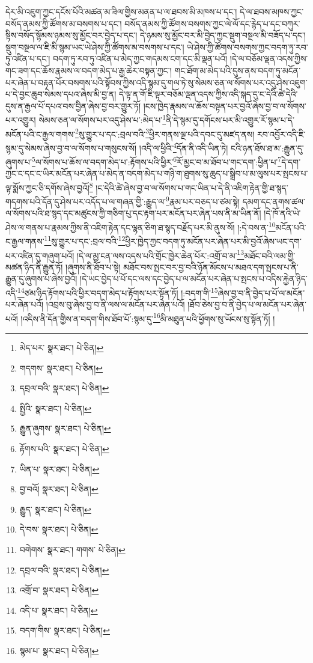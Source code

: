 དེར་མི་འཇུག་ཀྱང་དངོས་པོའི་མཚན་མ་ཟིལ་གྱིས་མནན་པ་ལ་ཐབས་མི་མཁས་པ་དང་། དེ་ལ་ཐབས་མཁས་ཀྱང་བསོད་ནམས་ཀྱི་ཚོགས་མ་བསགས་པ་དང་། བསོད་ནམས་ཀྱི་ཚོགས་བསགས་ཀྱང་ལེ་ལོ་དང་རྙེད་པ་དང་བཀུར་སྟིས་བསོད་སྙོམས་ཉམས་སུ་མྱོང་བར་བྱེད་པ་དང་། དེ་ཉམས་སུ་མྱོང་བར་མི་བྱེད་ཀྱང་སྡུག་བསྔལ་མི་བཟོད་པ་དང་། སྡུག་བསྔལ་ལ་ཇི་མི་སྙམ་ཡང་ཡེ་ཤེས་ཀྱི་ཚོགས་མ་བསགས་པ་དང་། ཡེ་ཤེས་ཀྱི་ཚོགས་བསགས་ཀྱང་བདག་ཏུ་རབ་ཏུ་འཛིན་པ་དང་། བདག་ཏུ་རབ་ཏུ་འཛིན་པ་མེད་ཀྱང་གདམས་ངག་དང་མི་ལྡན་པའོ། །དེ་ལ་བཅོམ་ལྡན་འདས་ཀྱིས་གང་ཟག་དང་ཆོས་རྣམས་ལ་བདག་མེད་པ་རྒྱ་ཆེར་བསྟན་ཀྱང་། གང་ཐོག་མ་མེད་པའི་དུས་ནས་བདག་ཏུ་མངོན་པར་ཞེན་པ་བརྟན་པོར་བསགས་པའི་སྟོབས་ཀྱིས་འདི་སྙམ་དུ་གལ་ཏེ་སུ་སེམས་ཅན་ལ་སོགས་པར་འདུ་ཤེས་འཇུག་པ་དེ་བྱང་ཆུབ་སེམས་དཔའ་ཞེས་མི་བྱ་ན། དེ་ལྟ་ན་གོ་ཇི་ལྟར་བཅོམ་ལྡན་འདས་ཀྱིས་འདི་སྐད་དུ་ང་དེའི་ཚེ་དེའི་དུས་ན་རྒྱལ་པོ་དཔའ་བས་བྱིན་ཞེས་བྱ་བར་གྱུར་ཏོ། །ངས་ཁྱེད་རྣམས་ལ་ཆོས་བསྟན་པར་བྱའོ་ཞེས་བྱ་བ་ལ་སོགས་པར་འགྱུར། སེམས་ཅན་ལ་སོགས་པར་འདུ་ཤེས་པ་:མེད་པ་\footnote{མེད་པར་  སྣར་ཐང་།  པེ་ཅིན། }ནི་དེ་སྙམ་དུ་དགོངས་པར་མི་འགྱུར་རོ་སྙམ་པ་དེ་མངོན་པའི་ང་རྒྱལ་གགས་\footnote{གདགས་  སྣར་ཐང་།  པེ་ཅིན། }སུ་གྱུར་པ་དང་:བྲལ་བའི་\footnote{དབྲལ་བའི་  སྣར་ཐང་།  པེ་ཅིན། }ཕྱིར་གནས་ལྔ་པའི་དབང་དུ་མཛད་ནས། རབ་འབྱོར་འདི་ཇི་སྙམ་དུ་སེམས་ཞེས་བྱ་བ་ལ་སོགས་པ་གསུངས་སོ། །འདི་ལ་ཕྱིའི་\footnote{སྤྱིའི་  སྣར་ཐང་།  པེ་ཅིན། }དོན་ནི་འདི་ཡིན་ཏེ། ངའི་ཉན་ཐོས་ཐ་མ་:རྒྱུན་དུ་ཞུགས་པ་\footnote{རྒྱུན་ཞུགས་  སྣར་ཐང་།  པེ་ཅིན། }ལ་སོགས་པ་ཆོས་ལ་བདག་མེད་པ་:རྟོགས་པའི་ཕྱིར་\footnote{རྟོགས་པའི་  སྣར་ཐང་།  པེ་ཅིན། }རོ་མྱང་བ་མ་ཐོབ་པ་གང་དག་:ཕྱིན་པ་\footnote{ཡིན་པ་  སྣར་ཐང་།  པེ་ཅིན། }དེ་དག་ཀྱང་ང་དང་ང་ཡིར་མངོན་པར་ཞེན་པ་མེད་ན་བདག་མེད་པ་གཉི་ག་ཐུགས་སུ་ཆུད་པ་སྒྲིབ་པ་མ་ལུས་པར་སྤངས་པ་ལྟ་སྨོས་ཀྱང་ཅི་དགོས་ཞེས་བྱའོ།\footnote{བྱ་བའོ།  སྣར་ཐང་།  པེ་ཅིན། } །ང་དེའི་ཚེ་ཞེས་བྱ་བ་ལ་སོགས་པ་གང་ཡིན་པ་དེ་ནི་འཇིག་རྟེན་གྱི་ཐ་སྙད་གདགས་པའི་དོན་དུ་ཤེས་པར་འདོད་པ་ལ་གཞན་གྱི་:རྒྱུད་ལ་\footnote{རྒྱུད་  སྣར་ཐང་།  པེ་ཅིན། }རྣམ་པར་བཅད་པ་ཙམ་སྟེ། དམག་དང་ནགས་ཚལ་ལ་སོགས་པའི་ཐ་སྙད་དང་མཚུངས་ཀྱི་གཅིག་པུ་དང་རྟག་པར་མངོན་པར་ཞེན་པས་ནི་མ་ཡིན་ནོ། །དེ་ཁོ་ནའི་ཡེ་ཤེས་ལ་གནས་པ་རྣམས་ཀྱིས་ནི་འཇིག་རྟེན་དང་ལྷན་ཅིག་ཐ་སྙད་བརྗོད་པར་མི་ནུས་སོ། །:དེ་བས་ན་\footnote{དེ་བས་  སྣར་ཐང་།  པེ་ཅིན། }མངོན་པའི་ང་རྒྱལ་གནས་\footnote{བགེགས་  སྣར་ཐང་། གགས་  པེ་ཅིན། }སུ་གྱུར་པ་དང་:བྲལ་བའི་\footnote{དབྲལ་བའི་  སྣར་ཐང་།  པེ་ཅིན། }ཕྱིར་ཁྱེད་ཀྱང་བདག་ཏུ་མངོན་པར་ཞེན་པར་མི་བྱའོ་ཞེས་ཡང་དག་པར་འཛིན་དུ་གཞུག་པའོ། །དེ་ལ་མྱ་ངན་ལས་འདས་པའི་གྲོང་ཁྱེར་ཆེན་པོར་:འགྲོ་བ་མ་\footnote{འགྲོ་བ་  སྣར་ཐང་།  པེ་ཅིན། }མཐོང་བའི་ལམ་གྱི་མཚན་ཉིད་ནི་རྒྱུན་ཏོ། །ཞུགས་ནི་ཐོབ་པ་སྟེ། མཐོང་བས་སྤང་བར་བྱ་བའི་ཉོན་མོངས་པ་མཐའ་དག་སྤངས་པ་ནི་རྒྱུན་དུ་ཞུགས་པ་ཞེས་བྱའོ། །དེ་ཡང་བྱེད་པ་པོ་དང་ལས་དང་བྱེད་པ་ལ་མངོན་པར་ཞེན་པ་སྤངས་པ་འདིས་རྐྱེན་ཉིད་འདི་\footnote{འདི་པ་  སྣར་ཐང་།  པེ་ཅིན། }ཙམ་ཉིད་རྟོགས་པའི་ཕྱིར་བདག་མེད་པ་རྟོགས་པར་སྟོན་ཏོ། །:བདག་གི་\footnote{བདག་གིས་  སྣར་ཐང་།  པེ་ཅིན། }ཞེས་བྱ་བ་ནི་བྱེད་པ་པོ་ལ་མངོན་པར་ཞེན་པའོ། །འབྲས་བུ་ཞེས་བྱ་བ་ནི་ལས་ལ་མངོན་པར་ཞེན་པའོ། །ཐོབ་ཅེས་བྱ་བ་ནི་བྱེད་པ་ལ་མངོན་པར་ཞེན་པའོ། །འདིས་ནི་དོན་གྱིས་ན་བདག་གིས་ཐོབ་པོ་:སྙམ་དུ་\footnote{སྙམ་པ་  སྣར་ཐང་།  པེ་ཅིན། }མི་མཐུན་པའི་ཕྱོགས་སུ་ཡོངས་སུ་སྟོན་ཏོ། །
